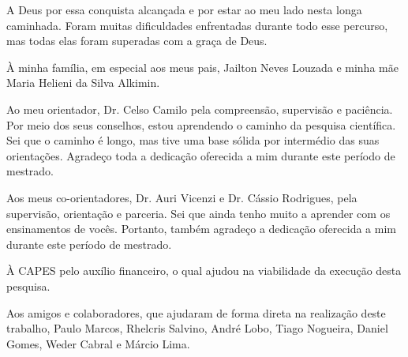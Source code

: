 \begin{agradecimentos}
A Deus por essa conquista alcançada e por estar ao meu lado nesta longa caminhada. Foram muitas dificuldades enfrentadas durante todo esse percurso, mas todas elas foram superadas com a graça de Deus.

À minha família, em especial aos meus pais, Jailton Neves Louzada e minha mãe Maria Helieni da Silva Alkimin.

Ao meu orientador, Dr. Celso Camilo pela compreensão, supervisão e paciência. Por meio dos seus conselhos, estou aprendendo o caminho da pesquisa científica. Sei que o caminho é longo, mas tive uma base sólida por intermédio das suas orientações. Agradeço toda a dedicação oferecida a mim durante este período de mestrado.

Aos meus co-orientadores, Dr. Auri Vicenzi e Dr. Cássio Rodrigues, pela supervisão, orientação e parceria. Sei que ainda tenho muito a aprender com os ensinamentos de vocês. Portanto, também agradeço a dedicação oferecida a mim durante este período de mestrado.

À CAPES pelo auxílio financeiro, o qual ajudou na viabilidade da execução desta pesquisa.

Aos amigos e colaboradores, que ajudaram de forma direta na realização deste trabalho, Paulo Marcos, Rhelcris Salvino, André Lobo, Tiago Nogueira, Daniel Gomes, Weder Cabral e Márcio Lima.

\end{agradecimentos}


